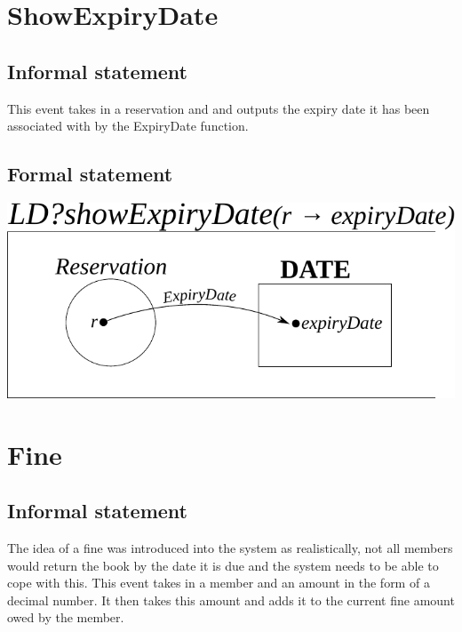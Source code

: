 \documentclass[]{report}
\begin{document}
\section{ShowExpiryDate}
\subsection{Informal statement}
This event takes in a reservation and and outputs the expiry date it has been associated with by the ExpiryDate function.
\subsection{Formal statement}
\begin{center}
	\includegraphics{show_expiry_date.pdf}
\end{center}
\newpage
\section{Fine}
\subsection{Informal statement}
The idea of a fine was introduced into the system as realistically, not all members would return the book by the date it is due and the system needs to be able to cope with this. This event takes in a member and an amount in the form of a decimal number. It then takes this amount and adds it to the current fine amount owed by the member.
\end{document}
